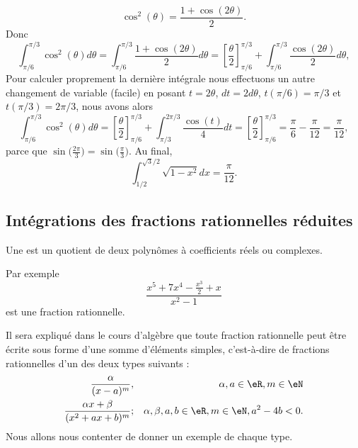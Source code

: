 \begin{example}
\begin{equation}
        \cos^2(\theta)=\frac{ 1+\cos(2\theta) }{ 2 }.
    \end{equation}
    Donc
    \begin{equation}
        \int_{\pi/6}^{\pi/3}\cos^2(\theta)d\theta=\int_{\pi/6}^{\pi/3}\frac{ 1+\cos(2\theta) }{2}d\theta=\left[ \frac{ \theta }{2}\right]_{\pi/6}^{\pi/3}+\int_{\pi/6}^{\pi/3}\frac{ \cos(2\theta) }{2}d\theta,
    \end{equation}
    Pour calculer proprement la dernière intégrale nous effectuons un autre changement de variable (facile) en posant $t = 2\theta$, $dt = 2 d\theta$, $t(\pi/6) = \pi/3$ et $t(\pi/3) = 2\pi/3$, nous avons alors
    \begin{equation}
        \int_{\pi/6}^{\pi/3}\cos^2(\theta)d\theta=\left[ \frac{ \theta }{2}\right]_{\pi/6}^{\pi/3}+\int_{\pi/3}^{2\pi/3}\frac{ \cos(t) }{4}dt  = \left[ \frac{ \theta }{2}\right]_{\pi/6}^{\pi/3}=\frac{ \pi }{ 6 }-\frac{ \pi }{ 12 }=\frac{ \pi }{ 12 },
    \end{equation}
    parce que \( \sin\big( \frac{ 2\pi }{ 3 } \big)=\sin\big( \frac{ \pi }{ 3 } \big)\). Au final,
    \begin{equation}
        \int_{1/2}^{\sqrt{3}/2}\sqrt{1-x^2}dx=\frac{ \pi }{ 12 }.
    \end{equation}
\end{example}

\subsection{Intégrations des fractions rationnelles réduites}

\begin{definition}
    Une  est un quotient de deux polynômes à coefficients réels ou complexes.
\end{definition}
Par exemple
\begin{equation}
    \frac{ x^5+7x^4-\frac{ x^3 }{2}+x }{ x^2-1 }
\end{equation}
est une fraction rationnelle.

Il sera expliqué dans le cours d'algèbre que toute fraction rationnelle peut être écrite sous forme d'une somme d'éléments simples, c'est-à-dire de fractions rationnelles d'un des deux types suivants :
\begin{subequations}
    \begin{align}
        \frac{ \alpha }{ (x-a)^m },&& \alpha,a\in \eR,m\in \eN  \label{CasMMIooZnZpUWi}\\
        \frac{ \alpha x+\beta }{ (x^2+ax+b)^m };&&\alpha, \beta ,a,b\in \eR,m\in \eN,a^2-4b<0. \label{CasMMIooZnZpUWii}
    \end{align}
\end{subequations}
Nous allons nous contenter de donner un exemple de chaque type.

